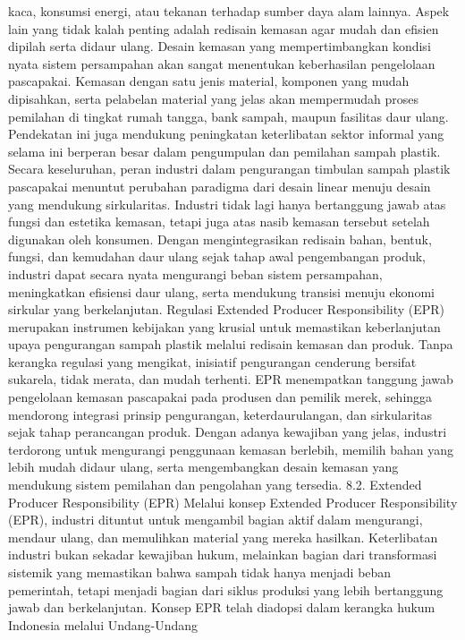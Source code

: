 \documentclass[
  letterpaper,
  DIV=11,
  numbers=noendperiod]{scrreprt}
\begin{document}
kaca, konsumsi energi, atau tekanan terhadap sumber daya alam lainnya.
Aspek lain yang tidak kalah penting adalah redisain kemasan agar mudah
dan efisien dipilah serta didaur ulang. Desain kemasan yang
mempertimbangkan kondisi nyata sistem persampahan akan sangat menentukan
keberhasilan pengelolaan pascapakai. Kemasan dengan satu jenis material,
komponen yang mudah dipisahkan, serta pelabelan material yang jelas akan
mempermudah proses pemilahan di tingkat rumah tangga, bank sampah,
maupun fasilitas daur ulang. Pendekatan ini juga mendukung peningkatan
keterlibatan sektor informal yang selama ini berperan besar dalam
pengumpulan dan pemilahan sampah plastik. Secara keseluruhan, peran
industri dalam pengurangan timbulan sampah plastik pascapakai menuntut
perubahan paradigma dari desain linear menuju desain yang mendukung
sirkularitas. Industri tidak lagi hanya bertanggung jawab atas fungsi
dan estetika kemasan, tetapi juga atas nasib kemasan tersebut setelah
digunakan oleh konsumen. Dengan mengintegrasikan redisain bahan, bentuk,
fungsi, dan kemudahan daur ulang sejak tahap awal pengembangan produk,
industri dapat secara nyata mengurangi beban sistem persampahan,
meningkatkan efisiensi daur ulang, serta mendukung transisi menuju
ekonomi sirkular yang berkelanjutan. Regulasi Extended Producer
Responsibility (EPR) merupakan instrumen kebijakan yang krusial untuk
memastikan keberlanjutan upaya pengurangan sampah plastik melalui
redisain kemasan dan produk. Tanpa kerangka regulasi yang mengikat,
inisiatif pengurangan cenderung bersifat sukarela, tidak merata, dan
mudah terhenti. EPR menempatkan tanggung jawab pengelolaan kemasan
pascapakai pada produsen dan pemilik merek, sehingga mendorong integrasi
prinsip pengurangan, keterdaurulangan, dan sirkularitas sejak tahap
perancangan produk. Dengan adanya kewajiban yang jelas, industri
terdorong untuk mengurangi penggunaan kemasan berlebih, memilih bahan
yang lebih mudah didaur ulang, serta mengembangkan desain kemasan yang
mendukung sistem pemilahan dan pengolahan yang tersedia. 8.2. Extended
Producer Responsibility (EPR) Melalui konsep Extended Producer
Responsibility (EPR), industri dituntut untuk mengambil bagian aktif
dalam mengurangi, mendaur ulang, dan memulihkan material yang mereka
hasilkan. Keterlibatan industri bukan sekadar kewajiban hukum, melainkan
bagian dari transformasi sistemik yang memastikan bahwa sampah tidak
hanya menjadi beban pemerintah, tetapi menjadi bagian dari siklus
produksi yang lebih bertanggung jawab dan berkelanjutan. Konsep EPR
telah diadopsi dalam kerangka hukum Indonesia melalui Undang-Undang
\end{document}
